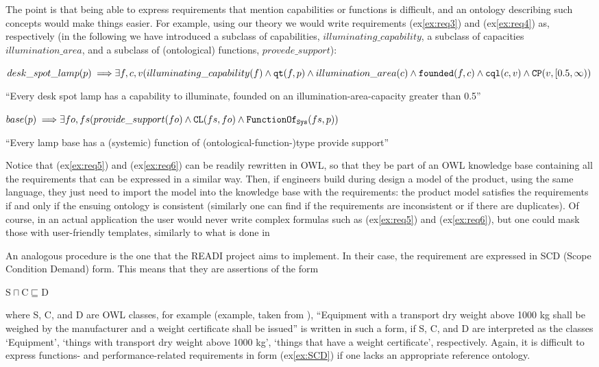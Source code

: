 \documentclass[sw]{iosart2x}
\newcommand{\bflist}{\begin{list}{}{\setlength{\topsep}{2mm}\setlength{\partopsep}{0mm}\setlength{\parsep}{0mm}\setlength{\leftmargin}{9mm}\setlength{\labelwidth}{8mm}}}
\newcommand{\eflist}{\end{list}}
\newcommand{\ExLabel}{\textrm{ex}}
\newcommand{\myex}[1]{\refstepcounter{cntex}\begin{small}{\bf \ExLabel\thecntex\label{ex:#1}}\end{small}}
\newcounter{cntex}
\newcommand{\mytext}[1]{``#1''}
\newcommand{\refex}[1]{({\ExLabel}\ref{#1})}
\newcommand{\generalStyle}[1]{\texttt{#1}}
\newcommand{\biRel}[3]{\generalStyle{#1}(#2,#3)}
\newcommand{\biRelPar}[4]{\generalStyle{#1}_{\generalStyle{#4}}(#2,#3)}
\newcommand{\myfi}{\hspace{0.9mm} \Longrightarrow}
\newcommand{\OWL}{\textnormal{OWL}\xspace}
\newcommand{\DOLCEPartBin}[2]{\biRel{{CP}}{#1}{#2}}
\newcommand{\DOLCEQualityDirect}[2]{\biRel{qt}{#1}{#2}}
\newcommand{\DOLCEQualeDirect}[2]{\biRel{{cql}}{#1}{#2}}
\newcommand{\DOLCECLbyBinary}[2]{\biRel{CL}{#1}{#2}}
\newcommand{\FunctionSysOf}[2]{\biRelPar{FunctionOf}{#1}{#2}{Sys}}
\newcommand{\founded}[2]{\biRel{\foundedTerm{passive}}{#1}{#2}}
\newcommand{\foundedTerm}[1]{%
  \ifthenelse{\equal{#1}{passive}}{founded}{%
    \ifthenelse{\equal{#1}{verb}}{found}{%
      \ifthenelse{\equal{#1}{gerund}}{founding}{%
        ERROR!%
      }%
    }%
  }%
}
\newcommand{\quotes}[1]{`#1'}
\newcommand{\qquotes}[1]{``#1''}
\begin{document}
The point is that being able to express requirements that mention capabilities or functions is difficult, and an ontology describing such concepts would make things easier.
For example, using our theory we would write requirements \refex{ex:req3} and \refex{ex:req4} as, respectively (in the following we have introduced a subclass of capabilities, $illuminating\_capability$, a subclass of capacities $illumination\_area$, and a subclass of (ontological) functions, $provede\_support$):
\bflist
  \item[\myex{req5}] $ desk\_spot\_lamp(p) \myfi \exists f,c,v( illuminating\_capability(f) \land \DOLCEQualityDirect{f}{p} \land illumination\_area(c) \land \\ \founded{f}{c} \land \DOLCEQualeDirect{c}{v} \land \DOLCEPartBin{v}{[0.5, \infty)}$
  \item[] \mytext{Every desk spot lamp has a capability to illuminate, founded on an illumination-area-capacity greater than 0.5} 
  \item[\myex{req6}] $ base(p) \myfi \exists fo,fs (provide\_support(fo) \land \DOLCECLbyBinary{fs}{fo} \land \FunctionSysOf{fs}{p})$
  \item[] \mytext{Every lamp base has a (systemic) function of (ontological-function-)type provide support} 
\eflist
Notice that \refex{ex:req5} and \refex{ex:req6} can be readily rewritten in \OWL, so that they be part of an \OWL knowledge base containing all the requirements that can be expressed in a similar way. 
Then, if engineers build during design a model of the product, using the same language, they just need to import the model into the knowledge base with the requirements: the product model satisfies the requirements if and only if the ensuing ontology is consistent (similarly one can find if the requirements are inconsistent or if there are duplicates).  
Of course, in an actual application the user would never write complex formulas such as \refex{ex:req5} and \refex{ex:req6}, but one could mask those with user-friendly templates, similarly to what is done in \cite{chenOntologybasedRequirementVerification2020}  

An analogous procedure is the one that the READI project \cite{overliAssetInformationModelling2021,kluwerOntologybasedRequirementsManagement2018} aims to implement. 
In their case, the requirement are expressed in SCD (Scope Condition Demand) form.
This means that they are assertions of the form
\bflist
  \item[\myex{SCD}] $ \text{S} \sqcap \text{C} \sqsubseteq \text{D}  $
\eflist
where S, C, and D are \OWL classes, for example (example, taken from \cite{overliAssetInformationModelling2021}), \qquotes{Equipment with a transport dry weight above 1000 kg shall be weighed by the manufacturer and a weight certificate shall be issued} is written in such a form, if S, C, and D are interpreted as the classes \quotes{Equipment}, \quotes{things with transport dry weight above 1000 kg}, \quotes{things that have a weight certificate}, respectively.   
Again, it is difficult to express functions- and performance-related requirements in form \refex{ex:SCD} if one lacks an appropriate reference ontology. 
\end{document}
